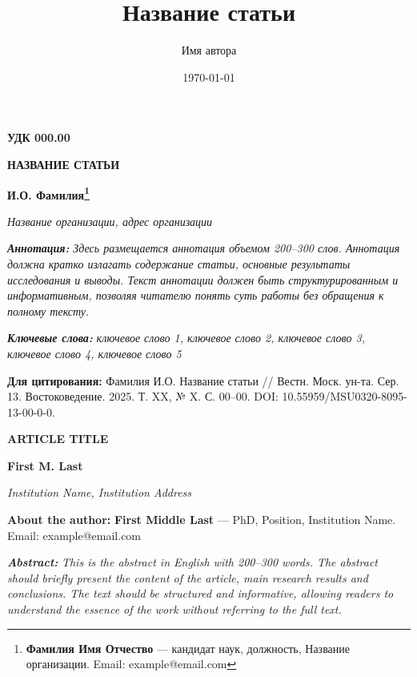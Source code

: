 \documentclass[12pt]{article}    %
\title{Название статьи}
\author{Имя автора}
\date{\today}
\newcommand{\udc}[1]{%
    \noindent\textbf{УДК #1}%
    \par\vspace{0.5em}%
}
\newcommand{\articletitleru}[1]{%
    \begin{center}
        \fontsize{14}{16}\selectfont\bfseries\MakeUppercase{#1}
    \end{center}
    \vspace{0.3em}
}
\newcommand{\authorru}[1]{%
    \begin{center}
        \fontsize{14}{16}\selectfont\bfseries #1
    \end{center}
    \vspace{0.3em}
}
\newcommand{\institution}[1]{%
    \begin{center}
        \fontsize{12}{14}\selectfont\itshape #1
    \end{center}
    \vspace{0.5em}
}
\newcommand{\abstractru}[1]{%
    \noindent\textbf{\textit{Аннотация:}} \textit{#1}%
    \par\vspace{0.5em}%
}
\newcommand{\keywordsru}[1]{%
    \noindent\textbf{\textit{Ключевые слова:}} \textit{#1}%
    \par\vspace{0.5em}%
}
\newcommand{\funding}[1]{%
    \noindent\textbf{Финансирование:} #1%
    \par\vspace{0.5em}%
}
\newcommand{\forcitation}[1]{%
    \noindent\textbf{Для цитирования:} #1%
    \par\vspace{1em}%
}
\newcommand{\articletitleen}[1]{%
    \begin{center}
        \fontsize{14}{16}\selectfont\bfseries\MakeUppercase{#1}
    \end{center}
    \vspace{0.3em}
}
\newcommand{\authoren}[1]{%
    \begin{center}
        \fontsize{14}{16}\selectfont\bfseries #1
    \end{center}
    \vspace{0.3em}
}
\newcommand{\institutionen}[1]{%
    \begin{center}
        \fontsize{12}{14}\selectfont\itshape #1
    \end{center}
    \vspace{0.5em}
}
\newcommand{\aboutauthor}[1]{%
    \noindent\textbf{About the author:} #1%
    \par\vspace{0.5em}%
}
\newcommand{\abstracten}[1]{%
    \noindent\textbf{\textit{Abstract:}} \textit{#1}%
    \par\vspace{0.5em}%
}
\begin{document}

\udc{000.00}

\articletitleru{Название статьи}

\authorru{И.О. Фамилия\footnote{%
    \textbf{Фамилия Имя Отчество} — кандидат наук, должность, Название организации. Email: example@email.com%
}}

\institution{Название организации, адрес организации}

\abstractru{Здесь размещается аннотация объемом 200--300 слов. Аннотация должна кратко излагать содержание статьи, основные результаты исследования и выводы. Текст аннотации должен быть структурированным и информативным, позволяя читателю понять суть работы без обращения к полному тексту.}

\keywordsru{ключевое слово 1, ключевое слово 2, ключевое слово 3, ключевое слово 4, ключевое слово 5}


\forcitation{Фамилия И.О. Название статьи // Вестн. Моск. ун-та. Сер. 13. Востоковедение. 2025. Т. XX, № X. С. 00--00. DOI: 10.55959/MSU0320-8095-13-00-0-0.}

\vspace{1em}


\articletitleen{Article Title}

\authoren{First M. Last}

\institutionen{Institution Name, Institution Address}

\aboutauthor{\textbf{First Middle Last} — PhD, Position, Institution Name. Email: example@email.com}

\abstracten{This is the abstract in English with 200--300 words. The abstract should briefly present the content of the article, main research results and conclusions. The text should be structured and informative, allowing readers to understand the essence of the work without referring to the full text.}
\end{document}
